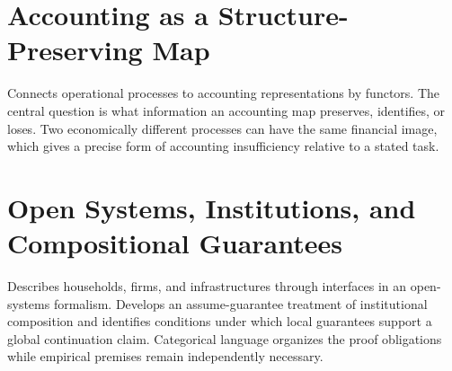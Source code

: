\chapter{Accounting as a Structure-Preserving Map}\label{ch:49}
Connects operational processes to accounting representations by functors. The central question is what information an accounting map preserves, identifies, or loses. Two economically different processes can have the same financial image, which gives a precise form of accounting insufficiency relative to a stated task.
\scaffold

\chapter{Open Systems, Institutions, and Compositional Guarantees}\label{ch:50}
Describes households, firms, and infrastructures through interfaces in an open-systems formalism. Develops an assume-guarantee treatment of institutional composition and identifies conditions under which local guarantees support a global continuation claim. Categorical language organizes the proof obligations while empirical premises remain independently necessary.
\scaffold
